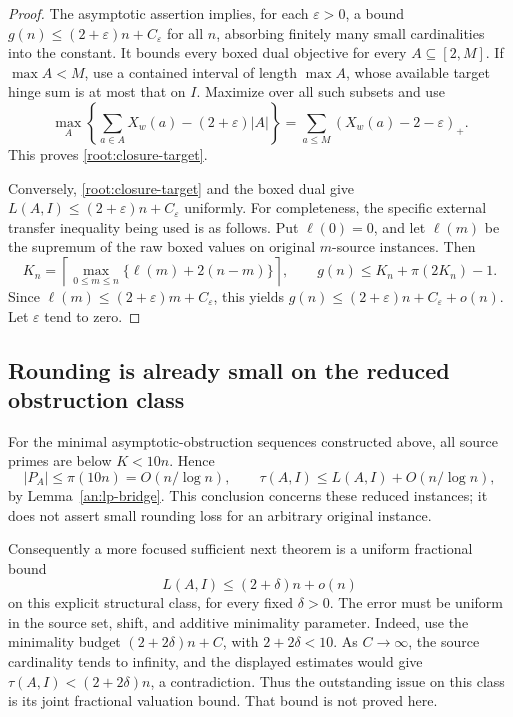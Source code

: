 \begin{proof}
The asymptotic assertion implies, for each \(\varepsilon>0\), a
bound \(g(n)\le(2+\varepsilon)n+C_\varepsilon\) for all \(n\),
absorbing finitely many small cardinalities into the constant. It
bounds every boxed dual objective for every
\(A\subseteq[2,M]\). If \(\max A<M\), use a contained interval
of length \(\max A\), whose available target hinge sum is at most
that on \(I\). Maximize over all such subsets and use
\[
 \max_A\left\{\sum_{a\in A}X_w(a)-(2+\varepsilon)|A|\right\}
 =\sum_{a\le M}(X_w(a)-2-\varepsilon)_+.
\]
This proves \eqref{root:closure-target}.

Conversely, \eqref{root:closure-target} and the boxed dual give
\(L(A,I)\le(2+\varepsilon)n+C_\varepsilon\) uniformly. For
completeness, the specific external transfer inequality being used
is as follows. Put \(\ell(0)=0\), and let \(\ell(m)\) be the
supremum of the raw boxed values on original \(m\)-source
instances. Then
\[
 K_n=\left\lceil\max_{0\le m\le n}
        \{\ell(m)+2(n-m)\}\right\rceil,
 \qquad g(n)\le K_n+\pi(2K_n)-1.
\]
Since \(\ell(m)\le(2+\varepsilon)m+C_\varepsilon\), this yields
\(g(n)\le(2+\varepsilon)n+C_\varepsilon+o(n)\).
Let \(\varepsilon\) tend to zero.
\end{proof}

\subsection{Rounding is already small on the reduced obstruction class}

For the minimal asymptotic-obstruction sequences constructed above,
all source primes are below \(K<10n\). Hence
\[
 |P_A|\le\pi(10n)=O(n/\log n),\qquad
 \tau(A,I)\le L(A,I)+O(n/\log n),
\]
by Lemma~\ref{an:lp-bridge}. This conclusion concerns these reduced
instances; it does not assert small rounding loss for an arbitrary
original instance.

Consequently a more focused sufficient next theorem is a uniform
fractional bound
\[
 L(A,I)\le(2+\delta)n+o(n)
\]
on this explicit structural class, for every fixed \(\delta>0\).
The error must be uniform in the source set, shift, and additive
minimality parameter. Indeed, use the minimality budget
\((2+2\delta)n+C\), with \(2+2\delta<10\). As \(C\to\infty\),
the source cardinality tends to infinity, and the displayed estimates
would give \(\tau(A,I)<(2+2\delta)n\), a contradiction. Thus the
outstanding issue on this class is its joint fractional valuation
bound. That bound is not proved here.

